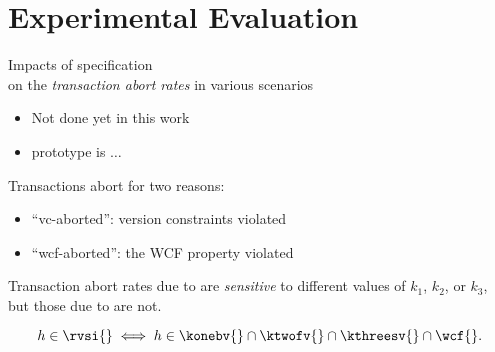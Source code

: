 \section{Experimental Evaluation}

\begin{frame}{}
  \begin{center}
    Impacts of \rvsi{} specification \\[5pt]
    on the \emph{transaction abort rates} in various scenarios
  \end{center}

  \pause
  \vspace{0.50cm}
  \centerline{}
  \begin{itemize}
    \item Not done yet in this work
    \item \chameleon{} prototype is $\ldots$
  \end{itemize}
\end{frame}

\begin{frame}{}
  Transactions abort for two reasons:
  \begin{itemize}
    \item ``vc-aborted'': \rvsi{} version constraints violated
    \item ``wcf-aborted'': the WCF property violated
  \end{itemize}

  \pause
  \vspace{0.60cm}
  Transaction abort rates due to  are \emph{sensitive} to different values of $k_1$, $k_2$, or $k_3$,
  \pause
  but those due to  are not.

  \pause
  \vspace{0.50cm}
  \[
    h \in \rvsi{} \iff h \in \konebv{} \cap \ktwofv{} \cap \kthreesv{} \cap \wcf{}.
  \]
\end{frame}

